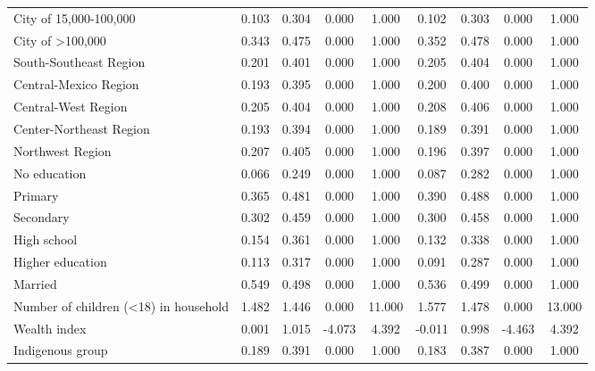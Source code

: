 \begin{table}[h!]
\begin{center}
{\begin{tabular}{l*{2}{cccc}}
City of 15,000-100,000&       0.103&       0.304&       0.000&       1.000&       0.102&       0.303&       0.000&       1.000\\
City of >100,000    &       0.343&       0.475&       0.000&       1.000&       0.352&       0.478&       0.000&       1.000\\
South-Southeast Region&       0.201&       0.401&       0.000&       1.000&       0.205&       0.404&       0.000&       1.000\\
Central-Mexico Region&       0.193&       0.395&       0.000&       1.000&       0.200&       0.400&       0.000&       1.000\\
Central-West Region &       0.205&       0.404&       0.000&       1.000&       0.208&       0.406&       0.000&       1.000\\
Center-Northeast Region&       0.193&       0.394&       0.000&       1.000&       0.189&       0.391&       0.000&       1.000\\
Northwest Region    &       0.207&       0.405&       0.000&       1.000&       0.196&       0.397&       0.000&       1.000\\
No education        &       0.066&       0.249&       0.000&       1.000&       0.087&       0.282&       0.000&       1.000\\
Primary             &       0.365&       0.481&       0.000&       1.000&       0.390&       0.488&       0.000&       1.000\\
Secondary           &       0.302&       0.459&       0.000&       1.000&       0.300&       0.458&       0.000&       1.000\\
High school         &       0.154&       0.361&       0.000&       1.000&       0.132&       0.338&       0.000&       1.000\\
Higher education    &       0.113&       0.317&       0.000&       1.000&       0.091&       0.287&       0.000&       1.000\\
Married             &       0.549&       0.498&       0.000&       1.000&       0.536&       0.499&       0.000&       1.000\\
Number of children (<18) in household&       1.482&       1.446&       0.000&      11.000&       1.577&       1.478&       0.000&      13.000\\
Wealth index        &       0.001&       1.015&      -4.073&       4.392&      -0.011&       0.998&      -4.463&       4.392\\
Indigenous group    &       0.189&       0.391&       0.000&       1.000&       0.183&       0.387&       0.000&       1.000\\

\end{tabular}}
\end{center}
\end{table}
